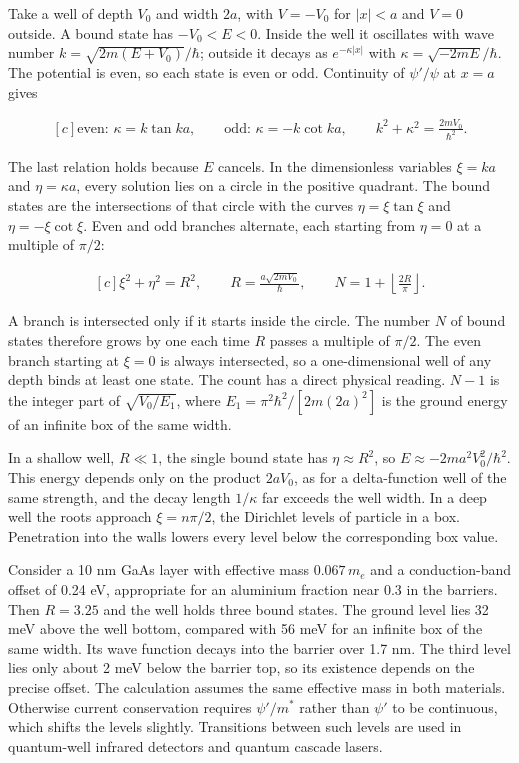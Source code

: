 \documentclass[11pt,oneside]{book}
\newenvironment{centeredalign}{\[\begin{gathered}[c]}{\end{gathered}\]}
\begin{document}
Take a well of depth \(V_0\) and width \(2a\), with \(V=-V_0\) for \(|x|<a\) and \(V=0\) outside. A bound state has \(-V_0<E<0\). Inside the well it oscillates with wave number \(k=\sqrt{2m(E+V_0)}/\hbar\); outside it decays as \(e^{-\kappa|x|}\) with \(\kappa=\sqrt{-2mE}/\hbar\). The potential is even, so each state is even or odd. Continuity of \(\psi'/\psi\) at \(x=a\) gives

\begin{centeredalign}
\text{even: }\kappa=k\tan ka,\qquad \text{odd: }\kappa=-k\cot ka,\qquad
k^2+\kappa^2=\frac{2mV_0}{\hbar^2}.
\end{centeredalign}

The last relation holds because \(E\) cancels. In the dimensionless variables \(\xi=ka\) and \(\eta=\kappa a\), every solution lies on a circle in the positive quadrant. The bound states are the intersections of that circle with the curves \(\eta=\xi\tan\xi\) and \(\eta=-\xi\cot\xi\). Even and odd branches alternate, each starting from \(\eta=0\) at a multiple of \(\pi/2\):

\begin{centeredalign}
\xi^2+\eta^2=R^2,\qquad R=\frac{a\sqrt{2mV_0}}{\hbar},\qquad
N=1+\left\lfloor\frac{2R}{\pi}\right\rfloor.
\end{centeredalign}

A branch is intersected only if it starts inside the circle. The number \(N\) of bound states therefore grows by one each time \(R\) passes a multiple of \(\pi/2\). The even branch starting at \(\xi=0\) is always intersected, so a one-dimensional well of any depth binds at least one state. The count has a direct physical reading. \(N-1\) is the integer part of \(\sqrt{V_0/E_1}\), where \(E_1=\pi^2\hbar^2/[2m(2a)^2]\) is the ground energy of an infinite box of the same width.

In a shallow well, \(R\ll1\), the single bound state has \(\eta\approx R^2\), so \(E\approx-2ma^2V_0^2/\hbar^2\). This energy depends only on the product \(2aV_0\), as for a delta-function well of the same strength, and the decay length \(1/\kappa\) far exceeds the well width. In a deep well the roots approach \(\xi=n\pi/2\), the Dirichlet levels of particle in a box. Penetration into the walls lowers every level below the corresponding box value.

Consider a 10 nm GaAs layer with effective mass \(0.067\,m_e\) and a conduction-band offset of 0.24 eV, appropriate for an aluminium fraction near 0.3 in the barriers. Then \(R=3.25\) and the well holds three bound states. The ground level lies 32 meV above the well bottom, compared with 56 meV for an infinite box of the same width. Its wave function decays into the barrier over 1.7 nm. The third level lies only about 2 meV below the barrier top, so its existence depends on the precise offset. The calculation assumes the same effective mass in both materials. Otherwise current conservation requires \(\psi'/m^*\) rather than \(\psi'\) to be continuous, which shifts the levels slightly. Transitions between such levels are used in quantum-well infrared detectors and quantum cascade lasers.
\end{document}
